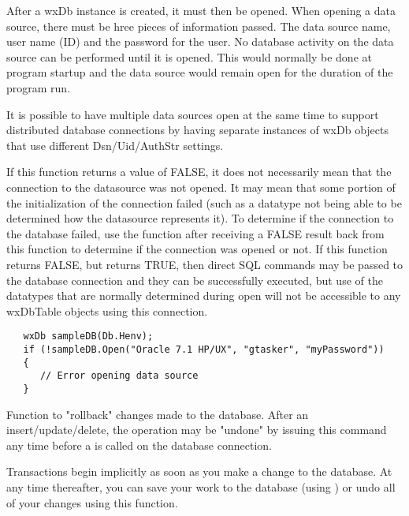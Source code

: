 
After a wxDb instance is created, it must then be opened.  When opening a 
data source, there must be hree pieces of information passed.  The data 
source name, user name (ID) and the password for the user.  No database 
activity on the data source can be performed until it is opened.  This 
would normally be done at program startup and the data source would remain 
open for the duration of the program run.  

It is possible to have multiple data sources open at the same time to 
support distributed database connections by having separate instances of wxDb 
objects that use different Dsn/Uid/AuthStr settings.

If this function returns a value of FALSE, it does not necessarily mean that 
the connection to the datasource was not opened.  It may mean that some 
portion of the initialization of the connection failed (such as a datatype not 
being able to be determined how the datasource represents it).  To determine 
if the connection to the database failed, use the  
function after receiving a FALSE result back from this function to determine if 
the connection was opened or not.  If this function returns FALSE, but  
returns TRUE, then direct SQL commands may be passed to the database 
connection and they can be successfully executed, but use of the datatypes 
that are normally determined during open will not be accessible to any 
wxDbTable objects using this connection.


\begin{verbatim}
   wxDb sampleDB(Db.Henv);
   if (!sampleDB.Open("Oracle 7.1 HP/UX", "gtasker", "myPassword"))
   {
      // Error opening data source
   }
\end{verbatim}


\label{wxdbrollbacktrans}


Function to "rollback" changes made to the database.  After an insert/update/delete, the operation may be "undone" by issuing this command any time before a  is called on the database connection.


Transactions begin implicitly as soon as you make a change to the database.  At any time thereafter, you can save your work to the database (using ) or undo all of your changes using this function.

